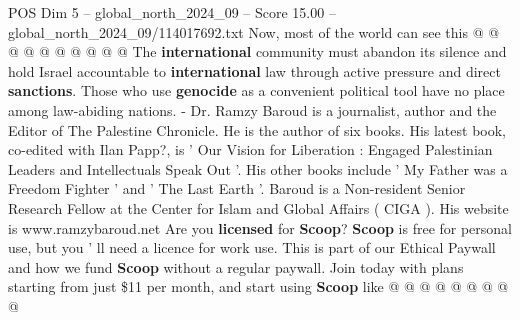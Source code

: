 \begin{textsample}{POS Dim 5 – global\_north\_2024\_09 – Score 15.00 – global\_north\_2024\_09/114017692.txt}
Now, most of the world can see this @ @ @ @ @ @ @ @ @ @ The \textbf{international} community must abandon its silence and hold Israel accountable to \textbf{international} law through active pressure and direct \textbf{sanctions}.
Those who use \textbf{genocide} as a convenient political tool have no place among law-abiding nations. - Dr.
Ramzy Baroud is a journalist, author and the Editor of The Palestine Chronicle.
He is the author of six books.
His latest book, co-edited with Ilan Papp?, is ' Our Vision for Liberation : Engaged Palestinian Leaders and Intellectuals Speak Out '.
His other books include ' My Father was a Freedom Fighter ' and ' The Last Earth '.
Baroud is a Non-resident Senior Research Fellow at the Center for Islam and Global Affairs ( CIGA ).
His website is www.ramzybaroud.net Are you \textbf{licensed} for \textbf{Scoop}? \textbf{Scoop} is free for personal use, but you ' ll need a licence for work use.
This is part of our Ethical Paywall and how we fund \textbf{Scoop} without a regular paywall.
Join today with plans starting from just \$11 per month, and start using \textbf{Scoop} like @ @ @ @ @ @ @ @ @

\end{textsample}
